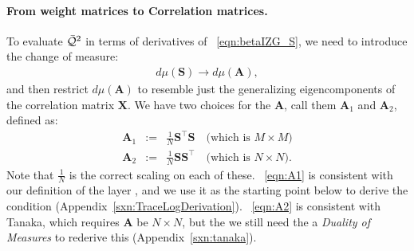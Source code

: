 \paragraph{From weight matrices to Correlation matrices.}
To evaluate $\bar{\mathcal{Q}}^{2}$ in terms of derivatives of \EQN~\ref{eqn:betaIZG_S}, we need to introduce the change of measure:
\begin{align}
  \label{eqn:changeOfMeasure}
  d\mu(\mathbf{S})\rightarrow d\mu(\mathbf{A}) ,
\end{align}
and then restrict $d\mu(\mathbf{A})$ to resemble just the generalizing eigencomponents of the \Teacher correlation matrix $\mathbf{X}$.
%
We have two choices for the \Student \CorrelationMatrix $\mathbf{A}$, call them $\mathbf{A}_{1}$
and $\mathbf{A}_{2}$, defined as:
\begin{eqnarray}
  \label{eqn:A1}
  \mathbf{A}_{1} &:=& \frac{1}{N}\mathbf{S}^{\top}\mathbf{S} \quad\mbox{(which is $M \times M$)} \\
  \label{eqn:A2}
  \mathbf{A}_{2} &:=& \frac{1}{N}\mathbf{S}\mathbf{S}^{\top} \quad\mbox{(which is $N \times N$)} .
\end{eqnarray}
Note that $\frac{1}{N}$ is the correct scaling on each of these.
\EQN~\ref{eqn:A1} is consistent with our definition of the layer \CorrelationMatrix, and we use it as the starting point
below to derive the \VolumePreserving \TRACELOG condition (Appendix~\ref{sxn:TraceLogDerivation}).
\EQN~\ref{eqn:A2} is consistent with Tanaka, which requires $\mathbf{A}$ be $N\times N$, but
the we still need the a \emph{Duality of Measures} to rederive this (Appendix~\ref{sxn:tanaka}).\cite{Tanaka2007, Tanaka2008}

